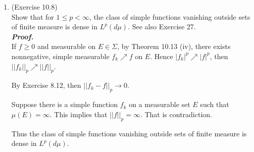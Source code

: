 \documentclass[a4paper,11pt]{article}
\begin{document}
\begin{enumerate}
	\item (Exercise 10.8)\\
		Show that for $1 \leq p < \infty$, the class of simple functions vanishing outside sets of finite measure is dense in $L^p(d\mu)$. See also Exercise 27.\\
	\newline
	\textit{\textbf {Proof.}}\\
		If $f \geq 0$ and measurable on $E \in \Sigma$, by Theorem 10.13 (iv), there exists nonnegative, simple measurable $f_k \nearrow f$ on $E$. Hence $|f_k|^p \nearrow |f|^p$, then $||f_k||_p \nearrow ||f||_p$.\

		By Exercise 8.12, then $||f_k - f||_p \to 0$.\

		Suppose there is a simple function $f_k$ on a measurable set $E$ such that $\mu(E) = \infty$. This implies that $||f||_p = \infty$. That is contradiction.\

		Thus the class of simple functions vanishing outside sets of finite measure is dense in $L^p(d \mu)$.


\end{enumerate}
\end{document}
